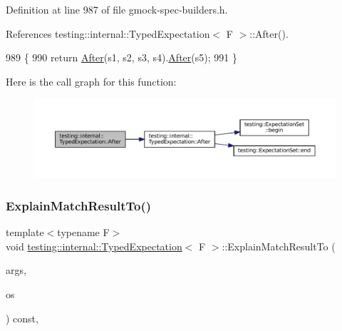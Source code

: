 Definition at line 987 of file gmock-\/spec-\/builders.\+h.



References testing\+::internal\+::\+Typed\+Expectation$<$ F $>$\+::\+After().


\begin{DoxyCode}
989                                                     \{
990     \textcolor{keywordflow}{return} \hyperlink{classtesting_1_1internal_1_1TypedExpectation_a30f320d18ebf1a40e94883d7a56c6c8c}{After}(s1, s2, s3, s4).\hyperlink{classtesting_1_1internal_1_1TypedExpectation_a30f320d18ebf1a40e94883d7a56c6c8c}{After}(s5);
991   \}
\end{DoxyCode}
Here is the call graph for this function\+:
\nopagebreak
\begin{figure}[H]
\begin{center}
\leavevmode
\includegraphics[width=350pt]{classtesting_1_1internal_1_1TypedExpectation_a72c0105b147ee2995d183c8e4109f6ca_cgraph}
\end{center}
\end{figure}
\mbox{\label{classtesting_1_1internal_1_1TypedExpectation_ad72e021fb66b7a91613e84644c6eb78b}} 
\subsubsection{\texorpdfstring{Explain\+Match\+Result\+To()}{ExplainMatchResultTo()}}
{\footnotesize\ttfamily template$<$typename F$>$ \\
void \hyperlink{classtesting_1_1internal_1_1TypedExpectation}{testing\+::internal\+::\+Typed\+Expectation}$<$ F $>$\+::Explain\+Match\+Result\+To (\begin{DoxyParamCaption}\item[{const \hyperlink{classtesting_1_1internal_1_1TypedExpectation_a9a91379262d101f435809ba4556d14fa}{Argument\+Tuple} \&}]{args,  }\item[{\+::std\+::ostream $\ast$}]{os }\end{DoxyParamCaption}) const\hspace{0.3cm}{\ttfamily [inline]}, {\ttfamily [private]}}



